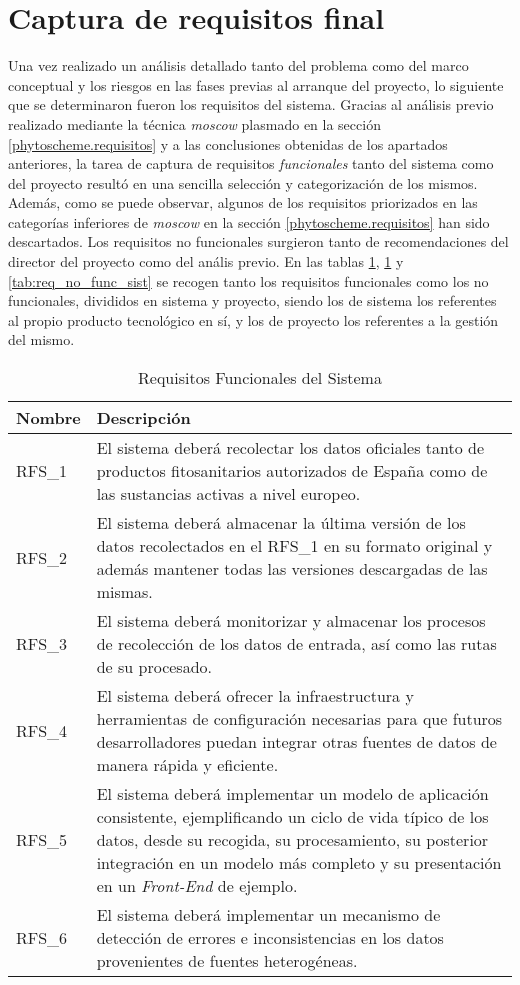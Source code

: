 \section{Captura de requisitos final}  \label{analisis.requisitos}
Una vez realizado un análisis detallado tanto del problema como del marco conceptual y los riesgos en las fases previas al arranque del proyecto, lo  siguiente que se determinaron fueron los requisitos del sistema. Gracias al análisis previo realizado mediante la técnica \textit{\gls{moscow}} plasmado en la sección \ref{phytoscheme.requisitos} y a las conclusiones obtenidas de los apartados anteriores, la tarea de captura de requisitos \textit{funcionales} tanto del sistema como del proyecto resultó en una sencilla selección y categorización de los mismos. Además, como se puede observar, algunos de los requisitos priorizados en las categorías inferiores de \textit{\gls{moscow}} en la sección \ref{phytoscheme.requisitos} han sido descartados. Los requisitos no funcionales surgieron tanto de recomendaciones del director del proyecto como del anális previo. En las tablas \ref{tab:req_func_sist}, \ref{tab:req_func_sist} y \ref{tab:req_no_func_sist} se recogen tanto los requisitos funcionales como los no funcionales, divididos en sistema y proyecto, siendo los de sistema los referentes al propio producto tecnológico en sí, y los de proyecto los referentes a la gestión del mismo. 
\par
\begin{table}[!t]
\centering
\bgroup
\def\arraystretch{1.3}
\begin{tabular}{l p{13cm}}
\toprule
\textbf{Nombre} & \textbf{Descripción} \\
 \midrule
RFS\_1 & 
El sistema deberá recolectar los datos oficiales tanto de productos fitosanitarios autorizados de España como de las sustancias activas a nivel europeo.
 \\
RFS\_2 & 
El sistema deberá almacenar la última versión de los datos recolectados en el RFS\_1 en su formato original y además mantener todas las versiones descargadas de las mismas. 
 \\
RFS\_3 & 
El sistema deberá monitorizar y almacenar los procesos de recolección de los datos de entrada, así como las rutas de su procesado. 
 \\
RFS\_4 & 
El sistema deberá ofrecer la infraestructura y herramientas de configuración necesarias para que futuros desarrolladores puedan integrar otras fuentes de datos de manera rápida y eficiente. 
 \\
RFS\_5 & 
El sistema deberá implementar un modelo de aplicación consistente, ejemplificando un ciclo de vida típico de los datos, desde su recogida, su procesamiento, su posterior integración en un modelo más completo y su presentación en un \textit{Front-End} de ejemplo.
 \\
RFS\_6 & 
El sistema deberá implementar un mecanismo de detección de errores e inconsistencias en los datos provenientes de fuentes heterogéneas.
 \\
\bottomrule
\end{tabular}
\egroup
\caption{Requisitos Funcionales del Sistema}
\label{tab:req_func_sist}
\end{table}


